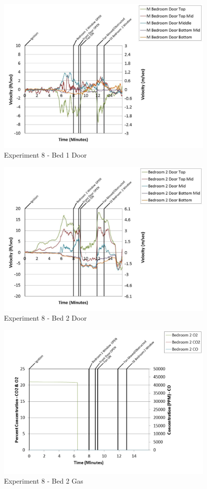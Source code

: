 \documentclass{article}
\begin{document}
\begin{appendices}
	\clearpage

	\begin{figure}[h!]
		\centering
		\includegraphics[height=3.05in]{0_Images/Results_Charts/Exp_8_Charts/Bed1Door.pdf}
		\caption{Experiment 8 - Bed 1 Door}
	\end{figure}
 

	\begin{figure}[h!]
		\centering
		\includegraphics[height=3.05in]{0_Images/Results_Charts/Exp_8_Charts/Bed2Door.pdf}
		\caption{Experiment 8 - Bed 2 Door}
	\end{figure}
 
	\clearpage

	\begin{figure}[h!]
		\centering
		\includegraphics[height=3.05in]{0_Images/Results_Charts/Exp_8_Charts/Bed2Gas.pdf}
		\caption{Experiment 8 - Bed 2 Gas}
	\end{figure}
 


\end{appendices}
\end{document}
